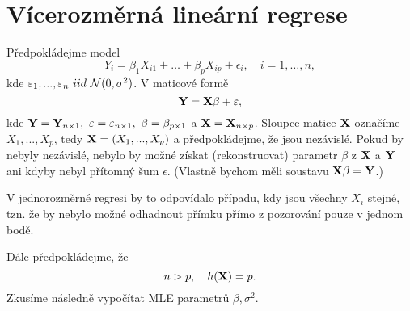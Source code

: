\chapter{Vícerozměrná lineární regrese}
Předpokládejme model
$$Y_i=\beta_1X_{i1}+\ldots+\beta_pX_{ip}+\epsilon_i, \quad i=1,\ldots,n, $$
kde $\varepsilon_1,...,\varepsilon_n~iid~\mathcal{N}(0,\sigma^2)$.
V maticové formě
$$\textbf{Y}=\textbf{X}\beta+\varepsilon,$$
kde $\textbf{Y}=\textbf{Y}_{n\times 1},~\varepsilon=\varepsilon_{n\times 1},~\beta=\beta_{p\times 1}$ a $\textbf{X}=\textbf{X}_{n\times p}$. Sloupce matice $\textbf{X}$ označíme $X_1,...,X_p$, tedy $\textbf{X}=(X_1,...,X_p) $ a předpokládejme, že jsou nezávislé. Pokud by nebyly nezávislé, nebylo by možné získat (rekonstruovat) parametr $\beta$ z $\textbf{X}$ a $\textbf{Y}$ ani kdyby nebyl přítomný šum $\epsilon$. (Vlastně bychom měli soustavu $\textbf{X}\beta=\textbf{Y}$.)\\
\begin{remark}
V jednorozměrné regresi by to odpovídalo případu, kdy jsou všechny $X_i$ stejné, tzn. že by nebylo možné odhadnout přímku přímo z pozorování pouze v jednom bodě.
\end{remark}
Dále předpokládejme, že
$$n>p, \quad h(\textbf{X})=p.$$
Zkusíme následně vypočítat MLE parametrů $\beta, \sigma^2$.
